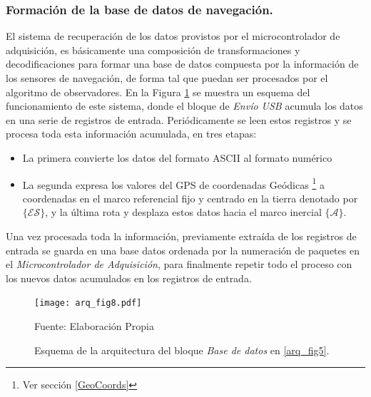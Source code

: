 \documentclass[10pt]{report}
\numberwithin{equation}{chapter}
\numberwithin{algorithm}{chapter}
\newcommand{\marco}[1]{\{\mathcal{#1}\}}
\begin{document}
\subsubsection{Formación de la base de datos de navegación.}
El sistema de recuperación de los datos provistos por el microcontrolador de adquisición, es básicamente una composición de transformaciones y decodificaciones para formar una base de datos compuesta por la información de los sensores de navegación, de forma tal que puedan ser procesados por el algoritmo de observadores. En la Figura \ref{arq_fig8} se muestra un esquema del funcionamiento de este sistema, donde el bloque de \emph{Envío USB} acumula los datos en una serie de registros de entrada. Periódicamente se leen estos registros y se procesa toda esta información acumulada, en tres etapas:
\begin{itemize}
 \item La primera convierte los datos del formato ASCII al formato numérico
 \item La segunda expresa los valores del GPS de coordenadas Geódicas \footnote{Ver sección \ref{GeoCoords}} a coordenadas en el marco referencial fijo y centrado en la tierra denotado por $\marco{ES}$, y la última  rota y desplaza estos datos hacia el marco inercial $\marco{A}$. 
\end{itemize}
Una vez procesada toda la información, previamente extraída de los registros de entrada se guarda en una base datos ordenada por la numeración de paquetes en el \emph{Microcontrolador de Adquisición}, para finalmente repetir todo el proceso con los nuevos datos acumulados en los registros de entrada.\par
\begin{figure}
\begin{center}
\texttt{[image: arq\_fig8.pdf]}
\caption{Esquema de la arquitectura del bloque \emph{Base de datos} en \ref{arq_fig5}.}
\scriptsize{Fuente: Elaboración Propia}
\label{arq_fig8}
\end{center}
\end{figure}
\end{document}

